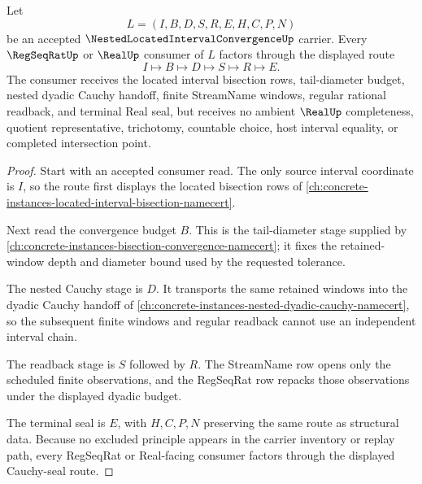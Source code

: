 \begin{theorem}
\label{thm:nested-located-interval-convergence-cauchy-seal-route}
Let
$$
L=(I,B,D,S,R,E,H,C,P,N)
$$
be an accepted $\NestedLocatedIntervalConvergenceUp$ carrier. Every $\RegSeqRatUp$ or $\RealUp$ consumer of $L$ factors through the displayed route
$$
I \longmapsto B \longmapsto D \longmapsto S \longmapsto R \longmapsto E .
$$
The consumer receives the located interval bisection rows, tail-diameter budget, nested dyadic Cauchy handoff, finite StreamName windows, regular rational readback, and terminal Real seal, but receives no ambient $\RealUp$ completeness, quotient representative, trichotomy, countable choice, host interval equality, or completed intersection point.
\end{theorem}
\begin{proof}
Start with an accepted consumer read. The only source interval coordinate is $I$, so the route first displays the located bisection rows of \autoref{ch:concrete-instances-located-interval-bisection-namecert}.

Next read the convergence budget $B$. This is the tail-diameter stage supplied by \autoref{ch:concrete-instances-bisection-convergence-namecert}; it fixes the retained-window depth and diameter bound used by the requested tolerance.

The nested Cauchy stage is $D$. It transports the same retained windows into the dyadic Cauchy handoff of \autoref{ch:concrete-instances-nested-dyadic-cauchy-namecert}, so the subsequent finite windows and regular readback cannot use an independent interval chain.

The readback stage is $S$ followed by $R$. The StreamName row opens only the scheduled finite observations, and the RegSeqRat row repacks those observations under the displayed dyadic budget.

The terminal seal is $E$, with $H,C,P,N$ preserving the same route as structural data. Because no excluded principle appears in the carrier inventory or replay path, every RegSeqRat or Real-facing consumer factors through the displayed Cauchy-seal route.
\end{proof}


